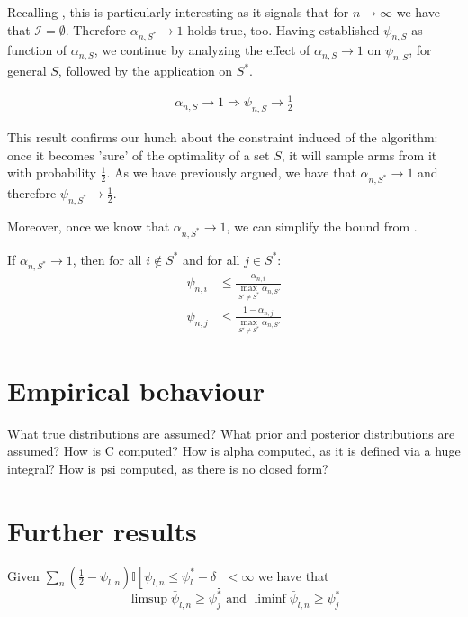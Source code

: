 Recalling , this is particularly interesting as it signals that for $n \rightarrow \infty$ we have that $\mathcal{I} = \emptyset$. Therefore $\alpha_{n, S^*} \rightarrow 1$ holds true, too.
Having established $\psi_{n, S}$ as function of $\alpha_{n, S}$, we continue by analyzing the effect of $\alpha_{n, S} \rightarrow 1$ on $\psi_{n, S}$, for general $S$, followed by the application on $S^*$.
\begin{lemma}\label{lemma:psi_convergence}
  \begin{align}
    \alpha_{n, S} \rightarrow 1 \Rightarrow \psi_{n, S} \rightarrow \frac{1}{2}
  \end{align}
\end{lemma}
This result confirms our hunch about the constraint induced of the algorithm: once it becomes 'sure' of the optimality of a set $S$, it will sample arms from it with probability $\frac{1}{2}$. As we have previously argued, we have that $\alpha_{n, S^*} \rightarrow 1$ and therefore $\psi_{n, S^*} \rightarrow \frac{1}{2}$.

Moreover, once we know that $\alpha_{n, S^*} \rightarrow 1$, we can simplify the bound from .
\begin{lemma}\label{lemma:measurement_plan_bound_max}
  If $\alpha_{n, S^*} \rightarrow 1$, then for all $i \notin S^*$ and for all $j \in S^*$:
  \begin{align}
    \psi_{n, i} &\leq \frac{\alpha_{n, i}}{\max_{S' \neq S^*} \alpha_{n, S'}} \\
    \psi_{n, j} &\leq \frac{1 - \alpha_{n, j}}{\max_{S' \neq S^*} \alpha_{n, S'}}
  \end{align}
\end{lemma}

\section{Empirical behaviour}\label{section:empirical_behaviour}
What true distributions are assumed?
What prior and posterior distributions are assumed?
How is C computed?
How is alpha computed, as it is defined via a huge integral?
How is psi computed, as there is no closed form?

\section{Further results}

\begin{lemma}\label{lemma:limsup_undersampling}
  Given $\sum_n(\frac{1}{2} - \psi_{l, n}) \mathbb{I}[\psi_{l, n} \leq \psi_l^* - \delta] < \infty$ we have that
  \[\limsup \bar{\psi}_{l, n} \geq \psi_j^* \text{ and } \liminf \bar{\psi}_{l, n} \geq \psi_j^*\]
\end{lemma}

